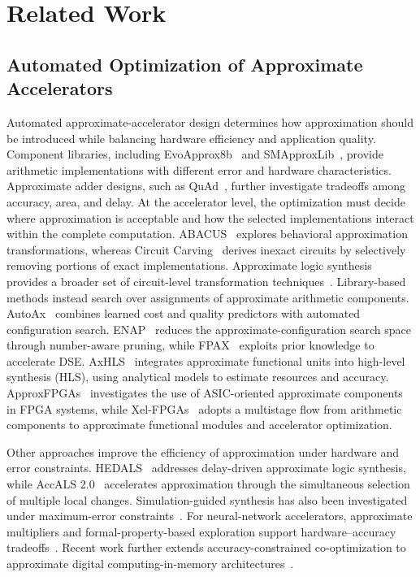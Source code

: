 
\section{Related Work}
\label{sec:related}

\subsection{Automated Optimization of Approximate Accelerators}

Automated approximate-accelerator design determines how approximation should be introduced while balancing hardware efficiency and application quality.
Component libraries, including EvoApprox8b~\cite{mrazek2017evoapprox} and SMApproxLib~\cite{ullah2018smapproxlib}, provide arithmetic implementations with different error and hardware characteristics.
Approximate adder designs, such as QuAd~\cite{hanif2017quad}, further investigate tradeoffs among accuracy, area, and delay.
At the accelerator level, the optimization must decide where approximation is acceptable and how the selected implementations interact within the complete computation.
ABACUS~\cite{nepal2014abacus} explores behavioral approximation transformations, whereas Circuit Carving~\cite{scarabottolo2018carving} derives inexact circuits by selectively removing portions of exact implementations.
Approximate logic synthesis provides a broader set of circuit-level transformation techniques~\cite{scarabottolo2020als}.
Library-based methods instead search over assignments of approximate arithmetic components.
AutoAx~\cite{mrazek2019autoax} combines learned cost and quality predictors with automated configuration search.
ENAP~\cite{dou2023enap} reduces the approximate-configuration search space through number-aware pruning, while FPAX~\cite{duo2024fpax} exploits prior knowledge to accelerate DSE.
AxHLS~\cite{castrogodinez2020axhls} integrates approximate functional units into high-level synthesis (HLS), using analytical models to estimate resources and accuracy.
ApproxFPGAs~\cite{prabakaran2020approxfpgas} investigates the use of ASIC-oriented approximate components in FPGA systems, while Xel-FPGAs~\cite{prabakaran2023xelfpgas} adopts a multistage flow from arithmetic components to approximate functional modules and accelerator optimization.

Other approaches improve the efficiency of approximation under hardware and error constraints.
HEDALS~\cite{meng2023hedals} addresses delay-driven approximate logic synthesis, while AccALS 2.0~\cite{wang2025accals2} accelerates approximation through the simultaneous selection of multiple local changes.
Simulation-guided synthesis has also been investigated under maximum-error constraints~\cite{meng2026simulation}.
For neural-network accelerators, approximate multipliers and formal-property-based exploration support hardware--accuracy tradeoffs~\cite{ansari2020approxmult,spantidi2022energy}.
Recent work further extends accuracy-constrained co-optimization to approximate digital computing-in-memory architectures~\cite{zhou2026openacmv2}.

